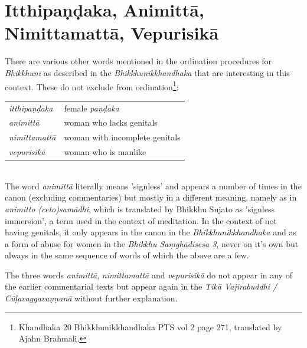 \section{Itthipaṇḍaka, Animittā, Nimittamattā, Vepurisikā}

There are various other words mentioned in the ordination procedures for {\em Bhikkhunī} as described in the {\em Bhikkhunikkhandhaka} that are interesting in this context. These do not exclude from ordination\footnote{Khandhaka 20 Bhikkhunikkhandhaka PTS vol 2 page 271, translated by Ajahn Brahmali.}: \\

\begin{tabular}{ l l }
 {\em itthipaṇḍaka} & female {\em paṇḍaka} \\
 {\em animittā } & woman who lacks genitals \\
 {\em nimittamattā } & woman with incomplete genitals \\ 
 {\em vepurisikā } & woman who is manlike \\
\end{tabular} \\

The word {\em animittā} literally means 'signless' and appears a number of times in the canon (excluding commentaries) but mostly in a different meaning, namely as in {\em animitto (ceto)samādhi}, which is translated by Bhikkhu Sujato as 'signless immersion', a term used in the context of meditation. In the context of not having genitals, it only appears in the canon in the {\em Bhikkhunikkhandhaka} and as a form of abuse for women in the {\em Bhikkhu Saṃ­ghā­di­sesa­ 3}, never on it's own but always in the same sequence of words of which the above are a few.

The three words  {\em animittā}, {\em nimittamattā} and {\em vepurisikā} do not appear in any of the earlier commentarial texts but appear again in the {\em Tikā Vajirabuddhi / Cūḷavaggavaṇṇanā} without further explanation.

